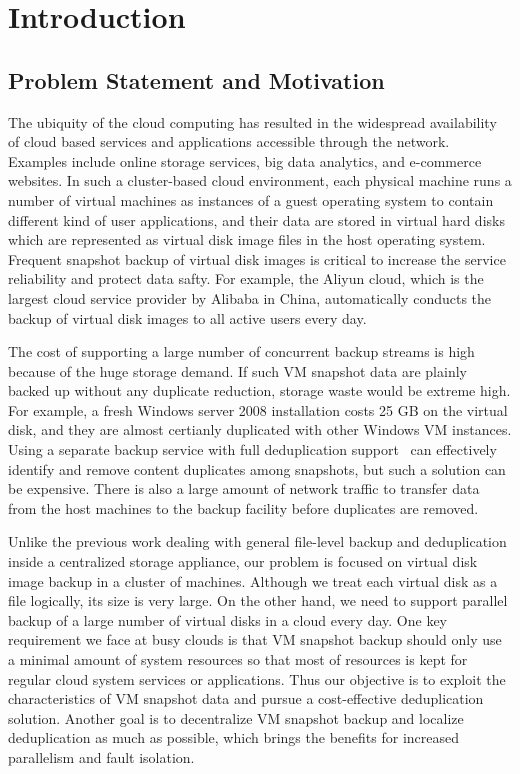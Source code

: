 \chapter{Introduction}
\label{chap:intro}
\section{Problem Statement and Motivation}
\label{intro:prob}
The ubiquity of the cloud computing has resulted in the 
widespread availability of cloud based services and applications accessible through 
the network. Examples include online storage services, big data analytics, and e-commerce websites.
In such a cluster-based cloud environment,
each physical machine runs a number of virtual machines as  instances of a guest operating system 
to contain different kind of user applications,
and their data are stored in virtual hard disks which are represented 
as virtual disk image files in the host operating system.
Frequent snapshot backup of virtual disk images is critical to increase  the service reliability
and protect data safty.
For example, the Aliyun cloud, which is  the largest cloud service provider by Alibaba in China, 
automatically conducts  the backup of virtual disk images to all active users every day.

The cost of supporting a large number of concurrent backup streams is high
because of the huge storage demand. 
If such VM snapshot data are plainly backed up without any duplicate reduction, storage waste would be 
extreme high. For example, a fresh Windows server 2008 installation costs 25 GB on the virtual disk,
and they are almost certianly duplicated with other Windows VM instances\cite{common07, pedal96}.
Using a separate  backup service with full deduplication support~\cite{venti02,bottleneck08}
can effectively identify and remove content duplicates among snapshots, 
but such a solution can be expensive. There is also a large amount of 
network traffic to transfer  data from the host machines to the backup facility
before duplicates are removed.

Unlike the previous work dealing with general file-level
backup and deduplication inside a centralized storage appliance, our problem is focused on virtual
disk image backup in a cluster of machines. Although we treat each virtual disk as a
file logically, its size is very large. On the other hand, we need
to support parallel backup of a large number of virtual disks
in a cloud every day. One key requirement we face at busy clouds
 is that VM snapshot backup should only use a minimal
amount of system resources so that most of resources is kept
for regular cloud system services or applications. Thus our
objective is to exploit the characteristics of VM snapshot data
and pursue a cost-effective deduplication solution. Another
goal is to decentralize VM snapshot backup and localize
deduplication as much as possible, which brings the benefits
for increased parallelism and fault isolation.

